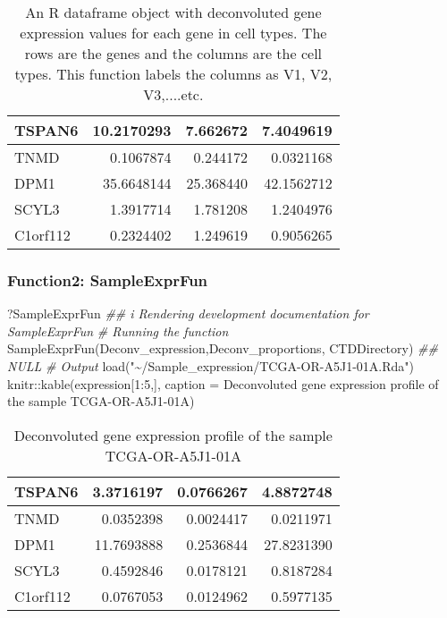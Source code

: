 \documentclass[]{article}
\newcommand{\hlnum}[1]{\textcolor[rgb]{0.816,0.125,0.439}{#1}}%
\newcommand{\hlstr}[1]{\textcolor[rgb]{0.251,0.627,0.251}{#1}}%
\newcommand{\hlcom}[1]{\textcolor[rgb]{0.502,0.502,0.502}{\textit{#1}}}%
\newcommand{\hlstd}[1]{\textcolor[rgb]{0.251,0.251,0.251}{#1}}%
\newenvironment{Shaded}{\begin{myshaded}}{\end{myshaded}}
\newcommand{\DecValTok}[1]{\hlnum{#1}}
\newcommand{\SpecialCharTok}[1]{\hlstr{#1}}
\newcommand{\StringTok}[1]{\hlstr{#1}}
\newcommand{\CommentTok}[1]{\hlcom{#1}}
\newcommand{\DocumentationTok}[1]{\hlcom{#1}}
\newcommand{\FunctionTok}[1]{\hlstd{#1}}
\newcommand{\AttributeTok}[1]{{#1}}
\newcommand{\NormalTok}[1]{\hlstd{#1}}
\begin{document}
\begin{table}

\caption{\label{tab:unnamed-chunk-76}An R dataframe object with deconvoluted gene expression values for each gene in cell types. The rows are the genes and the columns are the cell types. This function labels the columns as V1, V2, V3,....etc.}
\centering
\begin{tabular}[t]{l|r|r|r}
\hline
TSPAN6 & 10.2170293 & 7.662672 & 7.4049619\\
\hline
TNMD & 0.1067874 & 0.244172 & 0.0321168\\
\hline
DPM1 & 35.6648144 & 25.368440 & 42.1562712\\
\hline
SCYL3 & 1.3917714 & 1.781208 & 1.2404976\\
\hline
C1orf112 & 0.2324402 & 1.249619 & 0.9056265\\
\hline
\end{tabular}
\end{table}

\hypertarget{function2-sampleexprfun}{%
\subsubsection{\texorpdfstring{ Function2: SampleExprFun}{  Function2: SampleExprFun}}\label{function2-sampleexprfun}}

\begin{Shaded}
\begin{Highlighting}[]
\NormalTok{?SampleExprFun}
\DocumentationTok{\#\# i Rendering development documentation for \textquotesingle{}SampleExprFun\textquotesingle{}}
\CommentTok{\# Running the function}
\FunctionTok{SampleExprFun}\NormalTok{(Deconv\_expression,Deconv\_proportions, CTDDirectory)}
\DocumentationTok{\#\# NULL}
\CommentTok{\# Output}
\FunctionTok{load}\NormalTok{(}\StringTok{"\textasciitilde{}/Sample\_expression/TCGA{-}OR{-}A5J1{-}01A.Rda"}\NormalTok{)}
\NormalTok{knitr}\SpecialCharTok{::}\FunctionTok{kable}\NormalTok{(expression[}\DecValTok{1}\SpecialCharTok{:}\DecValTok{5}\NormalTok{,], }\AttributeTok{caption =} \StringTok{\textquotesingle{}Deconvoluted gene expression profile of the sample TCGA{-}OR{-}A5J1{-}01A\textquotesingle{}}\NormalTok{)}
\end{Highlighting}
\end{Shaded}

\begin{table}

\caption{\label{tab:unnamed-chunk-77}Deconvoluted gene expression profile of the sample TCGA-OR-A5J1-01A}
\centering
\begin{tabular}[t]{l|r|r|r}
\hline
TSPAN6 & 3.3716197 & 0.0766267 & 4.8872748\\
\hline
TNMD & 0.0352398 & 0.0024417 & 0.0211971\\
\hline
DPM1 & 11.7693888 & 0.2536844 & 27.8231390\\
\hline
SCYL3 & 0.4592846 & 0.0178121 & 0.8187284\\
\hline
C1orf112 & 0.0767053 & 0.0124962 & 0.5977135\\
\hline
\end{tabular}
\end{table}
\end{document}
